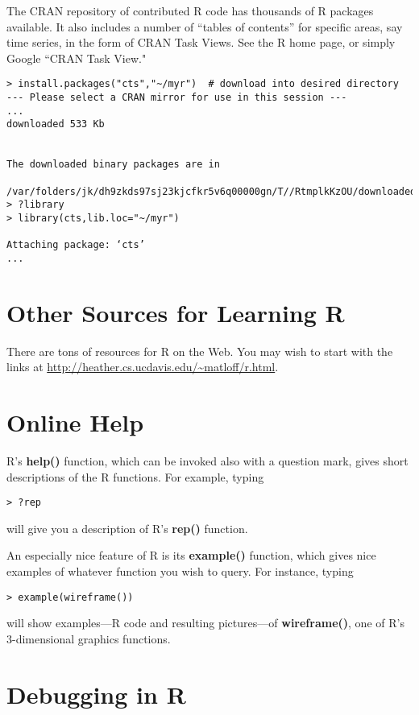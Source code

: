 The CRAN repository of contributed R code has thousands of R packages
available.  It also includes a number of ``tables of contents'' for
specific areas, say time series, in the form of CRAN Task Views.  See
the R home page, or simply Google ``CRAN Task View."

\begin{lstlisting}
> install.packages("cts","~/myr")  # download into desired directory
--- Please select a CRAN mirror for use in this session ---
...
downloaded 533 Kb


The downloaded binary packages are in
        /var/folders/jk/dh9zkds97sj23kjcfkr5v6q00000gn/T//RtmplkKzOU/downloaded_packages
> ?library
> library(cts,lib.loc="~/myr")

Attaching package: ‘cts’
...
\end{lstlisting}

\section{Other Sources for Learning R}

There are tons of resources for R on the Web.  You may wish to start
with the links at \url{http://heather.cs.ucdavis.edu/~matloff/r.html}.

\section{Online Help} 

R's {\bf help()} function, which can be invoked also with a
question mark, gives short descriptions of the R functions. For
example, typing

\begin{Verbatim}[fontsize=\relsize{-2}]
> ?rep
\end{Verbatim}
  
will give you a description of R's {\bf rep()} function.

An especially nice feature of R is its {\bf example()} function, which
gives nice examples of whatever function you wish to query. For
instance, typing

\begin{lstlisting}
> example(wireframe())
\end{lstlisting}
  
will show examples---R code and resulting pictures---of {\bf wireframe()},
one of R's 3-dimensional graphics functions.

\section{Debugging in R}

